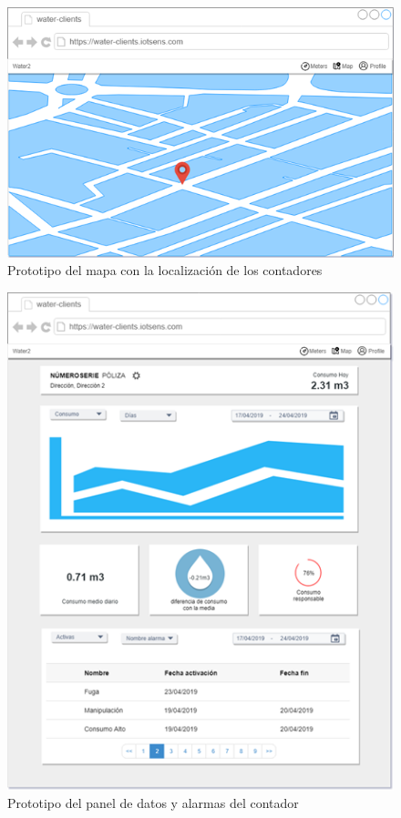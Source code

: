 \documentclass[pdftex,11pt,a4paper]{book}
\begin{document}
 \begin{figure}[h]
 \centering
 \includegraphics [scale=1] {images/prototipo/imagen3.png}
 \caption{Prototipo del mapa con la localización de los contadores} \label{fig:prototipo3}
 \end{figure}
 
 \begin{figure}[h]
 \centering
 \includegraphics [scale=1] {images/prototipo/imagen4.png}
 \caption{Prototipo del panel de datos y alarmas del contador} \label{fig:prototipo4}
 \end{figure}
\end{document}
